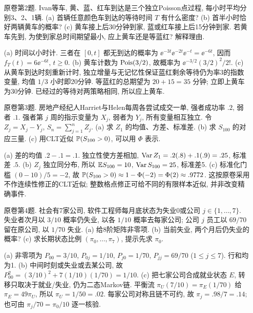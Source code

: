 \begin{exercise}\label{ex:fl18-2}
原卷第2题. Ivan等车, 黄、蓝、红车到达是三个独立Poisson点过程, 每小时平均分别3、2、1辆. (a) 首辆任意颜色车到达的等待时间 $T$ 有什么密度? (b) 首半小时恰好两辆黄车的概率? (c) 黄车接上后30分钟到家, 蓝或红车接上后15分钟到家. 若黄车先到, 为使到家总时间期望最小, 应上黄车还是等蓝红? 解释理由.
\end{exercise}
\begin{solution}
(a)\label{sol:fl18-2-a} 时间以小时计. 三者在 $[0,t]$ 都无到达的概率为 $\ee^{-3t}\ee^{-2t}\ee^{-t}=\ee^{-6t}$, 因而 $f_T(t)=6\ee^{-6t}$, $t\geq0$.
(b)\label{sol:fl18-2-b} 黄车计数为 $\operatorname{Pois}(3/2)$, 故概率为 $\ee^{-3/2}(3/2)^2/2!$.
(c)\label{sol:fl18-2-c} 从黄车到达时刻重新计时, 独立增量与无记忆性保证蓝红剩余等待仍为率3的指数变量, 均值 $1/3$ 小时即20分钟. 等蓝红的总期望为 $20+15=35$ 分钟; 立即上黄车为30分钟. 已经过的等待对两策略相同, 所以应上黄车.
\end{solution}

\begin{exercise}\label{ex:fl18-3}
原卷第3题. 房地产经纪人Harriet与Helen每周各尝试成交一单, 强者成功率 $.2$, 弱者 $.1$. 强者第 $j$ 周的指示变量为 $X_j$, 弱者为 $Y_j$, 所有变量相互独立. 令 $Z_j=X_j-Y_j$, $S_n=\sum_{j=1}^nZ_j$. (a) 求 $Z_1$ 的均值、方差、标准差. (b) 求 $S_{100}$ 的对应三量. (c) 用CLT近似 $\mathbb P(S_{100}>0)$, 可以用 $\Phi$ 表示.
\end{exercise}
\begin{solution}
(a)\label{sol:fl18-3-a} 差的均值 $.2-.1=.1$. 独立性使方差相加, $\operatorname{Var} Z_1=.2(.8)+.1(.9)=.25$, 标准差 $.5$.
(b)\label{sol:fl18-3-b} $Z_j$ 独立同分布, 所以 $\mathbb E S_{100}=10$, $\operatorname{Var} S_{100}=25$, 标准差5.
(c)\label{sol:fl18-3-c} 标准化门槛 $(0-10)/5=-2$, 故 $\mathbb P(S_{100}>0)\approx1-\Phi(-2)=\Phi(2)\approx.9772$. 这按原卷采用不作连续性修正的CLT近似; 整数格点修正可给不同的有限样本近似, 并非改变精确事件.
\end{solution}

\begin{exercise}\label{ex:fl18-4}
原卷第4题. 社会有7家公司, 软件工程师每月底状态为失业0或公司 $j\in\{1,\ldots,7\}$. 失业者次月以 $3/10$ 概率仍失业, 以各 $1/10$ 概率去每家公司; 公司 $j$ 员工以 $69/70$ 留在原公司, 以 $1/70$ 失业. (a) 给8阶矩阵非零项. (b) 当前失业, 两个月后仍失业的概率? (c) 求长期状态比例 $(\pi_0,\ldots,\pi_7)$, 提示先求 $\pi_0$.
\end{exercise}
\begin{solution}
(a)\label{sol:fl18-4-a} 非零项为 $P_{00}=3/10$, $P_{0j}=1/10$, $P_{j0}=1/70$, $P_{jj}=69/70$ ($1\leq j\leq7$). 行和均为1.
(b)\label{sol:fl18-4-b} 中间时刻或失业或去某公司, 故 $P^2_{00}=(3/10)^2+7(1/10)(1/70)=1/10$.
(c)\label{sol:fl18-4-c} 把七家公司合成就业状态 $E$, 转移只取决于就业/失业, 仍为二态Markov链. 平衡流 $\pi_U(7/10)=\pi_E(1/70)$ 给 $\pi_E=49\pi_U$, 所以 $\pi_U=1/50=.02$. 每家公司对称且链不可约, 故 $\pi_j=.98/7=.14$; 也可由 $\pi_j/70=\pi_0/10$ 逐一核验.
\end{solution}

